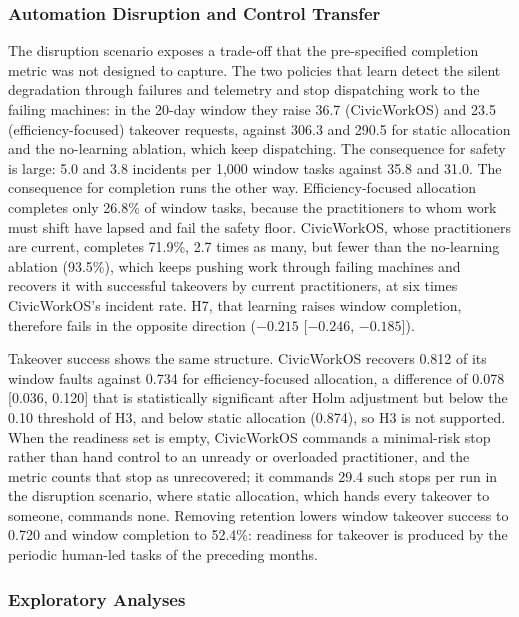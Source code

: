 \documentclass[utf8]{FrontiersinHarvard}
\begin{document}
	\subsubsection*{Automation Disruption and Control Transfer}

	The disruption scenario exposes a trade-off that the pre-specified completion metric was not designed to capture. The two policies that learn detect the silent degradation through failures and telemetry and stop dispatching work to the failing machines: in the 20-day window they raise 36.7 (CivicWorkOS) and 23.5 (efficiency-focused) takeover requests, against 306.3 and 290.5 for static allocation and the no-learning ablation, which keep dispatching. The consequence for safety is large: 5.0 and 3.8 incidents per 1,000 window tasks against 35.8 and 31.0. The consequence for completion runs the other way. Efficiency-focused allocation completes only 26.8\% of window tasks, because the practitioners to whom work must shift have lapsed and fail the safety floor. CivicWorkOS, whose practitioners are current, completes 71.9\%, 2.7 times as many, but fewer than the no-learning ablation (93.5\%), which keeps pushing work through failing machines and recovers it with successful takeovers by current practitioners, at six times CivicWorkOS's incident rate. H7, that learning raises window completion, therefore fails in the opposite direction ($-0.215$ [$-0.246$, $-0.185$]).

	Takeover success shows the same structure. CivicWorkOS recovers 0.812 of its window faults against 0.734 for efficiency-focused allocation, a difference of 0.078 [0.036, 0.120] that is statistically significant after Holm adjustment but below the 0.10 threshold of H3, and below static allocation (0.874), so H3 is not supported. When the readiness set is empty, CivicWorkOS commands a minimal-risk stop rather than hand control to an unready or overloaded practitioner, and the metric counts that stop as unrecovered; it commands 29.4 such stops per run in the disruption scenario, where static allocation, which hands every takeover to someone, commands none. Removing retention lowers window takeover success to 0.720 and window completion to 52.4\%: readiness for takeover is produced by the periodic human-led tasks of the preceding months.

	\subsubsection*{Exploratory Analyses}
\end{document}
